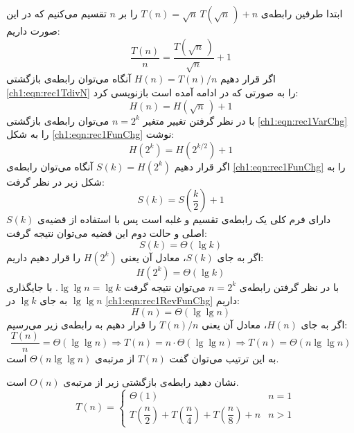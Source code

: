 {{

ابتدا طرفین رابطه‌ی {$T(n)=\sqrt{n}\,T(\sqrt{n}\,)+n$} را بر {$n$} تقسیم می‌کنیم که در این صورت داریم:
\begin{equation}
\dfrac{T(n)}{n}=\dfrac{T(\sqrt{n}\,)}{\sqrt{n}}+1\label{ch1:eqn:rec1TdivN}
\end{equation}
اگر قرار دهیم {$H(n)=T(n)/n$} آنگاه می‌توان رابطه‌ی بازگشتی {\eqref{ch1:eqn:rec1TdivN}} را به صورتی که در ادامه آمده است بازنویسی کرد:
\begin{equation}
H(n)=H(\sqrt{n}\,)+1\label{ch1:eqn:rec1VarChg}
\end{equation}
با در نظر گرفتن تغییر متغیر {$n=2^k$} می‌توان رابطه‌ی بازگشتی {\eqref{ch1:eqn:rec1VarChg}} را به شکل {\eqref{ch1:eqn:rec1FunChg}} نوشت:
\begin{equation}
H\left(2^k\right)=H\left(2^{k/2}\right)+1\label{ch1:eqn:rec1FunChg}
\end{equation}
اگر قرار دهیم {$S(k)=H(2^k)$} آنگاه می‌توان رابطه‌ی {\eqref{ch1:eqn:rec1FunChg}} را به شکل زیر در نظر گرفت:
\begin{displaymath}
S(k)=S\left(\dfrac{k}{2}\right)+1
\end{displaymath}
{$S(k)$} دارای فرم کلی یک رابطه‌ی تقسیم و غلبه است پس با استفاده از قضیه‌ی اصلی و حالت دوم این قضیه می‌توان نتیجه گرفت:
\begin{displaymath}
S(k)=\Theta( \lg k )
\end{displaymath}
اگر به جای {$S(k)$}، معادل آن یعنی {$H(2^k)$} را قرار دهیم داریم:
\begin{equation}
H(2^k)=\Theta( \lg k )\label{ch1:eqn:rec1RevFunChg}
\end{equation}
با در نظر گرفتن رابطه‌ی {$n=2^k$} می‌توان نتیجه گرفت {$\lg \lg n=\lg k$}. با جایگذاری {$\lg \lg n$} به جای {$\lg k$} در {\eqref{ch1:eqn:rec1RevFunChg}} داریم:
\begin{displaymath}
H(n)=\Theta( \lg \lg n )
\end{displaymath}
اگر به جای {$H(n)$}، معادل آن یعنی {$T(n)/n$} را قرار دهیم به رابطه‌ی زیر می‌رسیم:
\begin{displaymath}
\dfrac{T(n)}{n} =\Theta( \lg \lg n ) \Rightarrow T(n)=n\cdot \Theta( \lg \lg n ) \Rightarrow T(n)=\Theta( n\lg \lg n )
\end{displaymath}
به این ترتیب می‌توان گفت {$T(n)$} از مرتبه‌ی {$\Theta(n\lg \lg n)$} است.

 نشان دهید رابطه‌ی بازگشتی زیر از مرتبه‌ی {$O(n)$} است.
\begin{displaymath}
\quad T(n)=
\begin{cases}
\Theta (1) & n=1\\[0.3cm]
T\left(\dfrac{n}{2}\right)+T\left(\dfrac{n}{4}\right)+T\left(\dfrac{n}{8}\right)+n & n>1
\end{cases}
\end{displaymath}

}}

